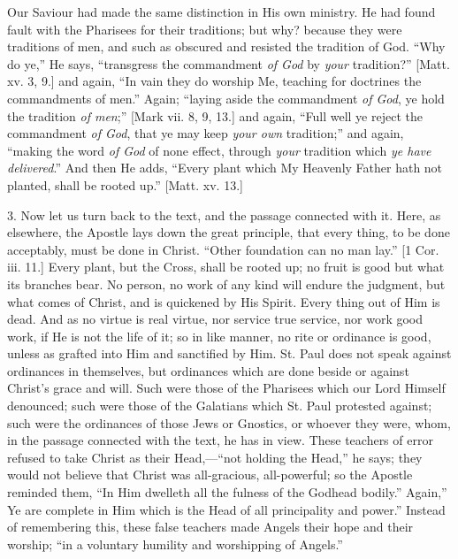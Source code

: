 Our Saviour had made the same distinction in His own ministry. He
had found fault with the Pharisees for their traditions; but why?
because they were traditions of men, and such as obscured and resisted
the tradition of God. ``Why do ye,'' He says, ``transgress
the commandment \emph{of God} by \emph{your} tradition?'' [Matt.
xv. 3, 9.] and again, ``In vain they do worship Me, teaching for
doctrines the commandments of men.'' Again; ``laying aside the
commandment \emph{of God}, ye hold the tradition \emph{of men};''
[Mark vii. 8, 9, 13.] and again, ``Full well ye reject the
commandment \emph{of God}, that ye may keep \emph{your own} tradition;'' and
again, ``making the word \emph{of God} of none effect, through \emph{your}
tradition which \emph{ye have delivered}.'' And then He adds,
``Every plant which My Heavenly Father hath not planted, shall be
rooted up.'' [Matt. xv. 13.]

3. Now let us turn back to the text, and the passage connected with
it. Here, as elsewhere, the Apostle lays down the great principle,
that every thing, to be done acceptably, must be done in Christ.
``Other foundation can no man lay.'' [1 Cor. iii. 11.] Every
plant, but the Cross, shall be rooted up; no fruit is good but what
its branches bear. No person, no work of any kind will endure the
judgment, but what comes of Christ, and is quickened by His Spirit.
Every thing out of Him is dead. And as no virtue is real virtue, nor
service true service, nor work good work, if He is not the life of it;
so in like manner, no rite or ordinance is good, unless as grafted
into Him and sanctified by Him. St. Paul does not speak against
ordinances in themselves, but ordinances which are done beside or
against Christ's grace and will. Such were those of the Pharisees
which our Lord Himself denounced; such were those of the Galatians
which St. Paul protested against; such were the ordinances of those
Jews or Gnostics, or whoever they were, whom, in the passage connected
with the text, he has in view. These teachers of error refused to take
Christ as their Head,—``not holding the Head,'' he says;
they would not believe that Christ was all-gracious, all-powerful; so
the Apostle reminded them, ``In Him dwelleth all the fulness of
the Godhead bodily.'' Again,'' Ye are complete in Him which is
the Head of all principality and power.'' Instead of remembering
this, these false teachers made Angels their hope and their worship;
``in a voluntary humility and worshipping of Angels.''


